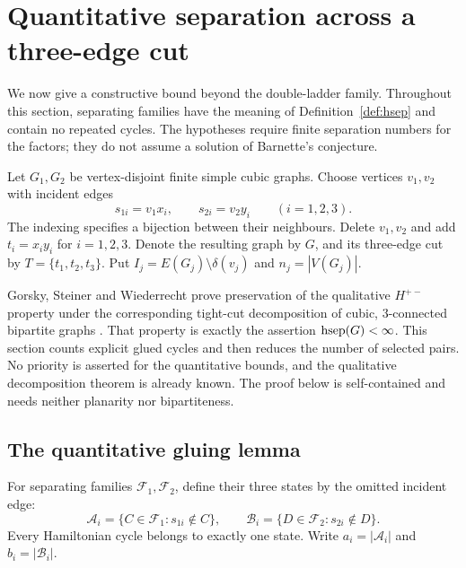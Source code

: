 \section{Quantitative separation across a three-edge cut}
\label{sec:quantitative-splice}

We now give a constructive bound beyond the double-ladder family. Throughout
this section, separating families have the meaning of Definition~\ref{def:hsep}
and contain no repeated cycles. The hypotheses require finite separation
numbers for the factors; they do not assume a solution of Barnette's conjecture.

Let $G_1,G_2$ be vertex-disjoint finite simple cubic graphs. Choose vertices
$v_1,v_2$ with incident edges
\[
 s_{1i}=v_1x_i,\qquad s_{2i}=v_2y_i\qquad (i=1,2,3).
\]
The indexing specifies a bijection between their neighbours. Delete $v_1,v_2$
and add $t_i=x_iy_i$ for $i=1,2,3$. Denote the resulting graph by $G$, and its
three-edge cut by $T=\{t_1,t_2,t_3\}$. Put
$I_j=E(G_j)\setminus\delta(v_j)$ and $n_j=|V(G_j)|$.

Gorsky, Steiner and Wiederrecht prove preservation of the qualitative
$H^{+-}$ property under the corresponding tight-cut decomposition of cubic,
3-connected bipartite graphs \citep[Lemma 4.5(iv) and Theorem 1.7(iv)]{GorskySteinerWiederrecht2023}.
That property is exactly the assertion $\operatorname{hsep}(G)<\infty$. This section
counts explicit glued cycles and then reduces the number of selected pairs.
No priority is asserted for the quantitative bounds, and the qualitative
decomposition theorem is already known. The proof below
is self-contained and needs neither planarity nor bipartiteness.

\subsection{The quantitative gluing lemma}
For separating families $\mathcal F_1,\mathcal F_2$, define their three states
by the omitted incident edge:
\[
 \mathcal A_i=\{C\in\mathcal F_1:s_{1i}\notin C\},\qquad
 \mathcal B_i=\{D\in\mathcal F_2:s_{2i}\notin D\}.
\]
Every Hamiltonian cycle belongs to exactly one state. Write
$a_i=|\mathcal A_i|$ and $b_i=|\mathcal B_i|$.

